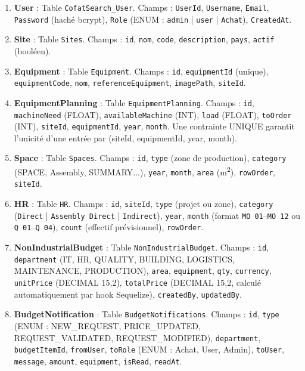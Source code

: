 \begin{enumerate}
    \item \textbf{User} : Table \texttt{CofatSearch\_User}. Champs : \texttt{UserId}, \texttt{Username}, \texttt{Email}, \texttt{Password} (haché bcrypt), \texttt{Role} (ENUM : \texttt{admin} | \texttt{user} | \texttt{Achat}), \texttt{CreatedAt}.
    \item \textbf{Site} : Table \texttt{Sites}. Champs : \texttt{id}, \texttt{nom}, \texttt{code}, \texttt{description}, \texttt{pays}, \texttt{actif} (booléen).
    \item \textbf{Equipment} : Table \texttt{Equipment}. Champs : \texttt{id}, \texttt{equipmentId} (unique), \texttt{equipmentCode}, \texttt{nom}, \texttt{referenceEquipment}, \texttt{imagePath}, \texttt{siteId}.
    \item \textbf{EquipmentPlanning} : Table \texttt{EquipmentPlanning}. Champs : \texttt{id}, \texttt{machineNeed} (FLOAT), \texttt{availableMachine} (INT), \texttt{load} (FLOAT), \texttt{toOrder} (INT), \texttt{siteId}, \texttt{equipmentId}, \texttt{year}, \texttt{month}. Une contrainte UNIQUE garantit l'unicité d'une entrée par (siteId, equipmentId, year, month).
    \item \textbf{Space} : Table \texttt{Spaces}. Champs : \texttt{id}, \texttt{type} (zone de production), \texttt{category} (SPACE, Assembly, SUMMARY...), \texttt{year}, \texttt{month}, \texttt{area} (m\textsuperscript{2}), \texttt{rowOrder}, \texttt{siteId}.
    \item \textbf{HR} : Table \texttt{HR}. Champs : \texttt{id}, \texttt{siteId}, \texttt{type} (projet ou zone), \texttt{category} (\texttt{Direct} | \texttt{Assembly Direct} | \texttt{Indirect}), \texttt{year}, \texttt{month} (format \texttt{MO 01}--\texttt{MO 12} ou \texttt{Q 01}--\texttt{Q 04}), \texttt{count} (effectif prévisionnel), \texttt{rowOrder}.
    \item \textbf{NonIndustrialBudget} : Table \texttt{NonIndustrialBudget}. Champs : \texttt{id}, \texttt{department} (IT, HR, QUALITY, BUILDING, LOGISTICS, MAINTENANCE, PRODUCTION), \texttt{area}, \texttt{equipment}, \texttt{qty}, \texttt{currency}, \texttt{unitPrice} (DECIMAL 15,2), \texttt{totalPrice} (DECIMAL 15,2, calculé automatiquement par hook Sequelize), \texttt{createdBy}, \texttt{updatedBy}.
    \item \textbf{BudgetNotification} : Table \texttt{BudgetNotifications}. Champs : \texttt{id}, \texttt{type} (ENUM : NEW\_REQUEST, PRICE\_UPDATED, REQUEST\_VALIDATED, REQUEST\_MODIFIED), \texttt{department}, \texttt{budgetItemId}, \texttt{fromUser}, \texttt{toRole} (ENUM : Achat, User, Admin), \texttt{toUser}, \texttt{message}, \texttt{amount}, \texttt{equipment}, \texttt{isRead}, \texttt{readAt}.

\end{enumerate}
